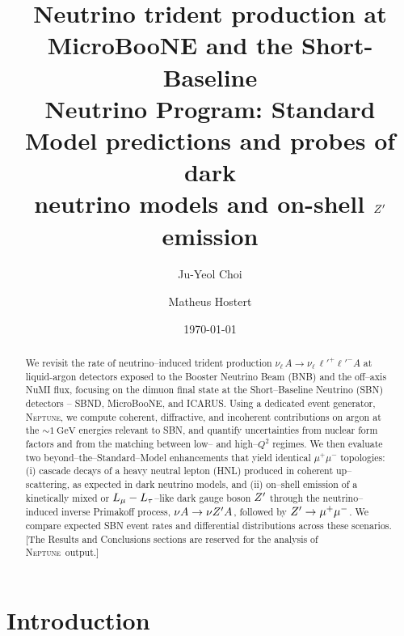 \newcommand{\Neptune}{\textsc{Neptune}}



\title{Neutrino trident production at MicroBooNE and the Short-Baseline\\
Neutrino Program: Standard Model predictions and probes of dark\\
neutrino models and on-shell $Z^{\prime}$ emission}

\author{Ju-Yeol Choi}

\author{Matheus Hostert}

\date{\today}

\begin{abstract}
We revisit the rate of neutrino--induced trident production
$\nu_\ell\, A \to \nu_\ell\, \ell'^+ \ell'^- A$ at liquid-argon detectors
exposed to the Booster Neutrino Beam (BNB) and the off--axis NuMI flux,
focusing on the dimuon final state at the Short--Baseline Neutrino (SBN)
detectors -- SBND, MicroBooNE, and ICARUS.  Using a dedicated event
generator, \Neptune, we compute coherent, diffractive, and incoherent
contributions on argon at the $\sim 1~\text{GeV}$ energies relevant to
SBN, and quantify uncertainties from nuclear form factors and from the
matching between low-- and high--$Q^{2}$ regimes.  We then evaluate two
beyond--the--Standard--Model enhancements that yield identical
$\mu^+\mu^-$ topologies: (i) cascade decays of a heavy neutral lepton
(HNL) produced in coherent up--scattering, as expected in dark neutrino
models, and (ii) on--shell emission of a kinetically mixed or
$L_\mu - L_\tau$--like dark gauge boson $Z^{\prime}$ through the
neutrino--induced inverse Primakoff process,
$\nu A \to \nu Z^{\prime} A$, followed by $Z^{\prime} \to \mu^+\mu^-$.  We compare
expected SBN event rates and differential distributions across these
scenarios.  [The Results and Conclusions sections are reserved for
the analysis of \Neptune\ output.]
\end{abstract}

\maketitle

\section{Introduction}\label{sec:intro}

